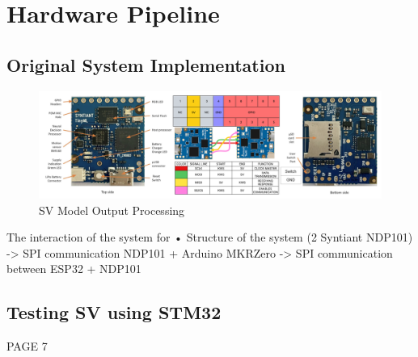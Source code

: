 \section{Hardware Pipeline}
\label{sec:hw pipeline}
\subsection{Original System Implementation}
\begin{center}
    \centering
    \begin{figure}[!h]
        \includegraphics[width=1.0\textwidth]{images/4.05 Hardware Pipeline 2 NDP101.png}
        \caption{SV Model Output Processing}
    \end{figure}
\end{center}
The interaction of the system for 
• Structure of the system (2 Syntiant NDP101)\newline
-> SPI communication NDP101 + Arduino MKRZero\newline
-> SPI communication between ESP32 + NDP101\newline\newline
\newpage
\subsection{Testing SV using STM32}
PAGE 7
\newpage


